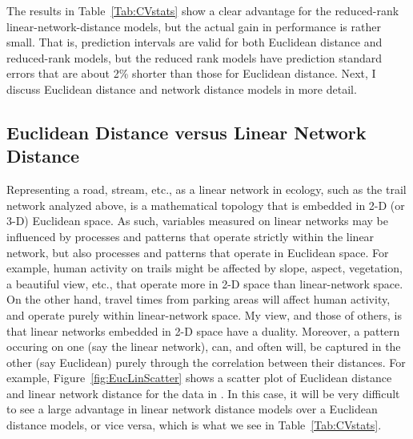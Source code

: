 The results in Table~\ref{Tab:CVstats} show a clear advantage for the reduced-rank linear-network-distance models, but the actual gain in performance is rather small.  That is, prediction intervals are valid for both Euclidean distance and reduced-rank models, but the reduced rank models have prediction standard errors that are about 2\% shorter than those for Euclidean distance. Next, I discuss Euclidean distance and network distance models in more detail.

\subsection*{Euclidean Distance versus Linear Network Distance}




Representing a road, stream, etc., as a linear network in ecology, such as the trail network analyzed above, is a mathematical topology that is embedded in 2-D (or 3-D) Euclidean space.  As such, variables measured on linear networks may be influenced by processes and patterns that operate strictly within the linear network, but also processes and patterns that operate in Euclidean space. For example, human activity on trails might be affected by slope, aspect, vegetation, a beautiful view, etc., that operate more in 2-D space than linear-network space.  On the other hand, travel times from parking areas will affect human activity, and operate purely within linear-network space. My view, and those of others, \citep{Dale:Fort:from:2010,Pete:Ver:Isaa:stre:2013} is that linear networks embedded in 2-D space have a duality.  Moreover, a pattern occuring on one (say the linear network), can, and often will, be captured in the other (say Euclidean) purely through the correlation between their distances.  For example, Figure~\ref{fig:EucLinScatter} shows a scatter plot of Euclidean distance and linear network distance for the data in \citet{Ladl:Avga:Whea:Boyc:pred:2016}.  In this case, it will be very difficult to see a large advantage in linear network distance models over a Euclidean distance models, or vice versa, which is what we see in Table~\ref{Tab:CVstats}.

